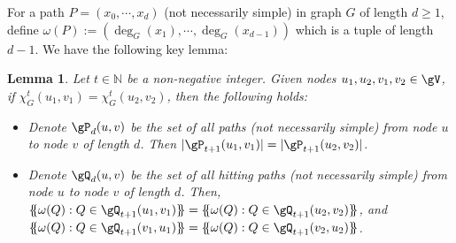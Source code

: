 \documentclass{article} %
\newtheorem{lemma}[theorem]{Lemma}
\newcommand*{\ldblbrace}{\{\mskip-5mu\{}
\newcommand*{\rdblbrace}{\}\mskip-5mu\}}
\begin{document}
For a path $P=(x_0,\cdots,x_d)$ (not necessarily simple) in graph $G$ of length $d\ge 1$, define $\omega(P):=(\deg_G(x_1),\cdots,\deg_G(x_{d-1}))$ which is a tuple of length $d-1$. We have the following key lemma:
\begin{lemma}
\label{thm:2fwl_path_key}
Let $t\in\mathbb N$ be a non-negative integer. Given nodes $u_1,u_2,v_1,v_2\in\gV$, if $\chi_G^t(u_1,v_1)=\chi_G^t(u_2,v_2)$, then the following holds:
\begin{itemize}[topsep=0pt,leftmargin=30pt]
\setlength{\itemsep}{0pt}
    \item Denote $\gP_d(u,v)$ be the set of all paths (not necessarily simple) from node $u$ to node $v$ of length $d$. Then $|\gP_{t+1}(u_1,v_1)|=|\gP_{t+1}(u_2,v_2)|$.
    \item Denote $\gQ_d(u,v)$ be the set of all hitting paths (not necessarily simple) from node $u$ to node $v$ of length $d$. Then, $\ldblbrace \omega(Q):Q\in\gQ_{t+1}(u_1,v_1)\rdblbrace=\ldblbrace \omega(Q):Q\in\gQ_{t+1}(u_2,v_2)\rdblbrace$, and $\ldblbrace \omega(Q):Q\in\gQ_{t+1}(v_1,u_1)\rdblbrace=\ldblbrace \omega(Q):Q\in\gQ_{t+1}(v_2,u_2)\rdblbrace$.
\end{itemize}
\end{lemma}
\end{document}
